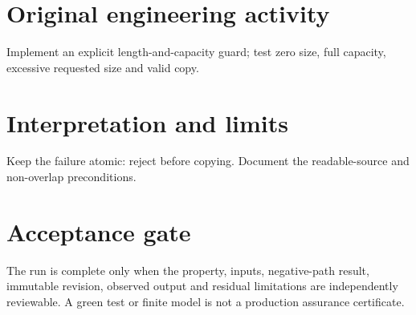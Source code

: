 \documentclass[10pt,letterpaper]{article}
\begin{document}
\section{Original engineering activity}
Implement an explicit length-and-capacity guard; test zero size, full capacity, excessive requested size and valid copy.
\section{Interpretation and limits}
Keep the failure atomic: reject before copying. Document the readable-source and non-overlap preconditions.
\section{Acceptance gate}
The run is complete only when the property, inputs, negative-path result, immutable revision, observed output and residual limitations are independently reviewable. A green test or finite model is not a production assurance certificate.
\end{document}
